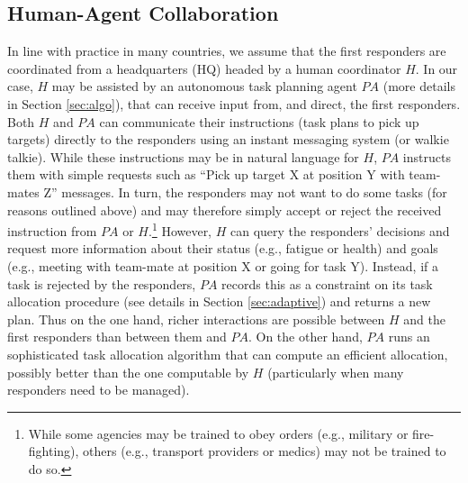 %
\subsection{Human-Agent Collaboration}
\noindent In line with practice in many countries, we assume that the first responders are coordinated from a headquarters (HQ) headed by a human coordinator $H$. In our case, $H$ may be assisted by an autonomous task planning agent $PA$ (more details in Section \ref{sec:algo}), that can receive input from, and direct, the first responders.   Both  $H$ and $PA$  can communicate their  instructions (task plans to pick up targets) directly to the responders using an instant messaging system (or walkie talkie).  While these instructions may be in natural language for $H$, $PA$ instructs them with simple requests such as ``Pick up target X at position Y with team-mates Z'' messages. In turn, the responders may not want to do some tasks (for reasons outlined above) and may therefore simply accept or reject the received instruction from $PA$ or $H$.\footnote{While some agencies may be trained to obey orders (e.g., military or fire-fighting), others (e.g., transport providers or medics) may not be trained to do so.} However, $H$ can query the responders' decisions and request  more information about their status (e.g., fatigue or health) and goals (e.g., meeting with team-mate at position X or going for task Y). Instead, if a task is rejected by the responders, $PA$ records this as a constraint on its task allocation procedure (see details in Section \ref{sec:adaptive}) and returns a new plan. Thus on the one hand, richer interactions are possible between $H$ and the first responders than between them and $PA$. On the other hand, $PA$ runs an sophisticated task allocation algorithm that can compute an efficient allocation, possibly better than the one computable by $H$ (particularly when many responders need to be managed). 

